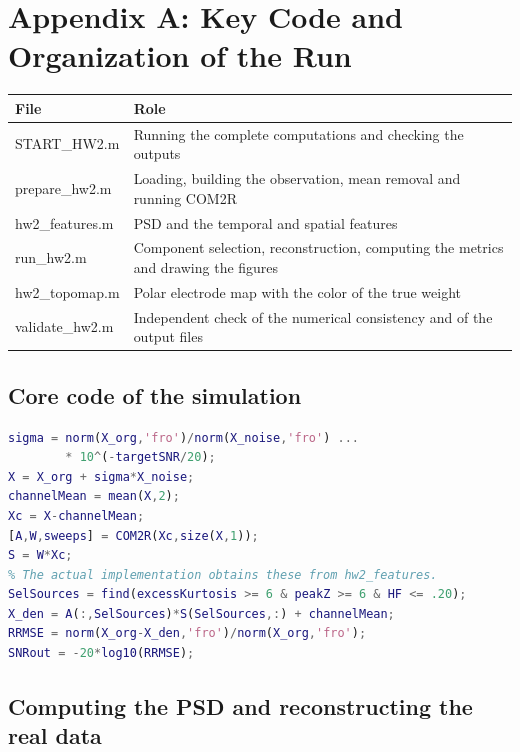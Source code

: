 \clearpage
\section*{Appendix A: Key Code and Organization of the Run}

\begin{center}
\begin{tabularx}{\textwidth}{@{}>{\ttfamily}l>{\raggedright\arraybackslash}X@{}}
\toprule
\textnormal{\textbf{File}} & \textbf{Role}\\
\midrule
START\_HW2.m & Running the complete computations and checking the outputs\\
prepare\_hw2.m & Loading, building the observation, mean removal and running COM2R\\
hw2\_features.m & PSD and the temporal and spatial features\\
run\_hw2.m & Component selection, reconstruction, computing the metrics and drawing the figures\\
hw2\_topomap.m & Polar electrode map with the color of the true weight\\
validate\_hw2.m & Independent check of the numerical consistency and of the output files\\
\bottomrule
\end{tabularx}
\end{center}

\subsection*{Core code of the simulation}

\begin{lstlisting}[language=Matlab]
sigma = norm(X_org,'fro')/norm(X_noise,'fro') ...
        * 10^(-targetSNR/20);
X = X_org + sigma*X_noise;
channelMean = mean(X,2);
Xc = X-channelMean;
[A,W,sweeps] = COM2R(Xc,size(X,1));
S = W*Xc;
% The actual implementation obtains these from hw2_features.
SelSources = find(excessKurtosis >= 6 & peakZ >= 6 & HF <= .20);
X_den = A(:,SelSources)*S(SelSources,:) + channelMean;
RRMSE = norm(X_org-X_den,'fro')/norm(X_org,'fro');
SNRout = -20*log10(RRMSE);
\end{lstlisting}

\subsection*{Computing the PSD and reconstructing the real data}

